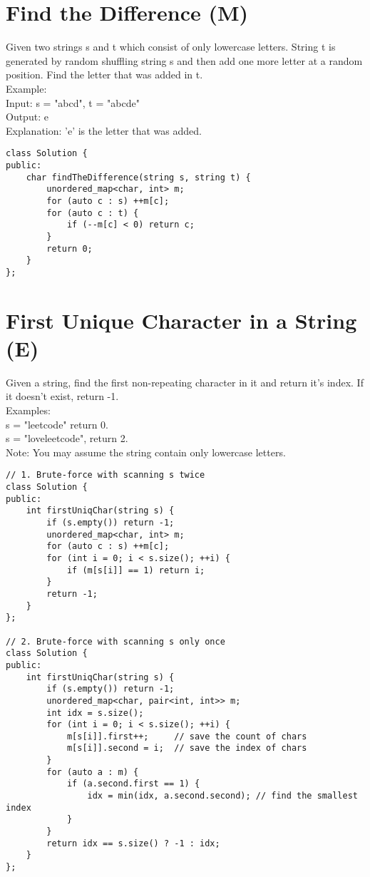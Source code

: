 \section{Find the Difference (M)}
Given two strings s and t which consist of only lowercase letters. String t is generated by random shuffling string s and then add one more letter at a random position. Find the letter that was added in t. \\

Example:\\
Input: s = "abcd", t = "abcde"\\
Output: e\\
Explanation: 'e' is the letter that was added.\\

\begin{lstlisting}
class Solution {
public:
    char findTheDifference(string s, string t) {
        unordered_map<char, int> m;
        for (auto c : s) ++m[c];
        for (auto c : t) {
            if (--m[c] < 0) return c;
        }
        return 0;
    }
};
\end{lstlisting}


\section{First Unique Character in a String (E)}
Given a string, find the first non-repeating character in it and return it's index. If it doesn't exist, return -1.\\

Examples:\\
s = "leetcode"
return 0.\\
s = "loveleetcode",
return 2.\\

Note: You may assume the string contain only lowercase letters. \\

\begin{lstlisting}
// 1. Brute-force with scanning s twice
class Solution {
public:
    int firstUniqChar(string s) {
        if (s.empty()) return -1;
        unordered_map<char, int> m;
        for (auto c : s) ++m[c];
        for (int i = 0; i < s.size(); ++i) {
            if (m[s[i]] == 1) return i;
        }
        return -1;
    }
};

// 2. Brute-force with scanning s only once
class Solution {
public:
    int firstUniqChar(string s) {
        if (s.empty()) return -1;
        unordered_map<char, pair<int, int>> m;
        int idx = s.size();
        for (int i = 0; i < s.size(); ++i) {
            m[s[i]].first++;     // save the count of chars
            m[s[i]].second = i;  // save the index of chars
        }
        for (auto a : m) {
            if (a.second.first == 1) {
                idx = min(idx, a.second.second); // find the smallest index
            }
        }
        return idx == s.size() ? -1 : idx;
    }
};
\end{lstlisting}


